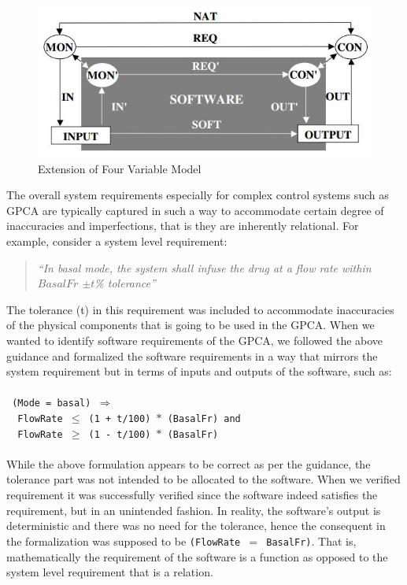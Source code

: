 \vspace{-0.1in}
\begin{figure}[h!]
    \centering
    \includegraphics[scale=0.5] {images/FourVarExtn.jpg}
    \caption{Extension of Four Variable Model}
    \label{fig:extn-four-var}
 \end{figure}
\vspace{-0.1in}

The overall system requirements especially for complex control systems such as GPCA are typically captured in such a way to accommodate certain degree of inaccuracies and imperfections, that is they are inherently relational. For example, consider a system level requirement:

\begin{quotation}
\emph{``In basal mode, the system shall infuse the drug at a flow rate within $BasalFr$ $\pm t$\% tolerance''}
\end{quotation}

The tolerance (t) in this requirement was included to accommodate inaccuracies of the physical components that is going to be used in the GPCA. When we wanted to identify software requirements of the GPCA, we followed the above guidance and formalized the software requirements in a way that mirrors the system requirement but in terms of inputs and outputs of the software, such as:
\\\\
\footnotesize{\texttt{
(Mode = basal) $\Rightarrow$\\
\textcolor{white}{------}FlowRate $\leq$ (1 + t/100) $\ast$ (BasalFr) and \\
\textcolor{white}{------}FlowRate $\geq$ (1 - t/100) $\ast$ (BasalFr)\\
}}
\normalsize{}\\
While the above formulation appears to be correct as per the guidance, the tolerance part was not intended to be allocated to the software. When we verified requirement it was successfully verified since the software indeed satisfies the requirement, but in an unintended fashion. In reality, the software's output is deterministic and there was no need for the tolerance, hence the consequent in the formalization was supposed to be \texttt{(FlowRate $=$ BasalFr)}. That is, mathematically the requirement of the software is a function as opposed to the system level requirement that is a relation. %


